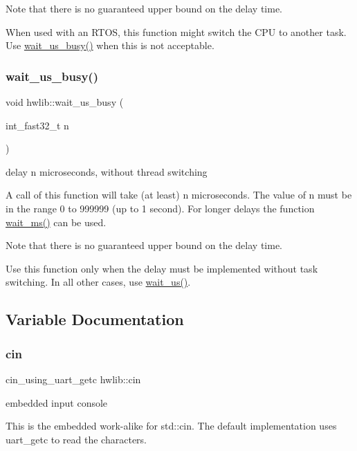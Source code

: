 Note that there is no guaranteed upper bound on the delay time.

When used with an R\+T\+OS, this function might switch the C\+PU to another task. Use \hyperlink{namespacehwlib_a9ebdd2f578adeea0543e9c99778e2459}{wait\+\_\+us\+\_\+busy()} when this is not acceptable. \mbox{\label{namespacehwlib_a9ebdd2f578adeea0543e9c99778e2459}} 
\subsubsection{\texorpdfstring{wait\+\_\+us\+\_\+busy()}{wait\_us\_busy()}}
{\footnotesize\ttfamily void hwlib\+::wait\+\_\+us\+\_\+busy (\begin{DoxyParamCaption}\item[{int\+\_\+fast32\+\_\+t}]{n }\end{DoxyParamCaption})}

delay n microseconds, without thread switching

A call of this function will take (at least) n microseconds. The value of n must be in the range 0 to 999999 (up to 1 second). For longer delays the function \hyperlink{namespacehwlib_a6119aa5d3034176aa1515ef4bb193044}{wait\+\_\+ms()} can be used.

Note that there is no guaranteed upper bound on the delay time.

Use this function only when the delay must be implemented without task switching. In all other cases, use \hyperlink{namespacehwlib_a0096b739fc566c896366ecbd3113cc1e}{wait\+\_\+us()}. 

\subsection{Variable Documentation}
\mbox{\label{namespacehwlib_ad736b5e00021a29fc5543ec7b36dfe14}} 
\subsubsection{\texorpdfstring{cin}{cin}}
{\footnotesize\ttfamily cin\+\_\+using\+\_\+uart\+\_\+getc hwlib\+::cin}

embedded input console

This is the embedded work-\/alike for std\+::cin. The default implementation uses uart\+\_\+getc to read the characters.

